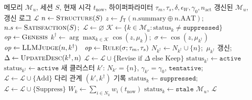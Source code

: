 \documentclass[10pt,twocolumn,letterpaper]{article}
\newcommand{\sT}{\mathsf{T}}
\newcommand{\cM}{\mathcal{M}}
\newcommand{\cK}{\mathcal{K}}
\newcommand{\op}[1]{\textsc{#1}}
\begin{document}
\begin{algorithm}[t]
\caption{$\op{Write}$: 세션 종료 시 장기 메모리 갱신}
\label{alg:write}
\small
\begin{algorithmic}[1]
\Require 메모리 $\cM_u$, 세션 $S$, 현재 시각 $t_{\mathrm{now}}$, 하이퍼파라미터 $\tau_m,\tau_s,\delta,\epsilon_W,\gamma_0,n_{\mathrm{act}}$
\Ensure 갱신된 $\cM_u$, 갱신 로그 $\mathcal{L}$
\State $n\gets\op{Structure}(S)$ 
\State $z\gets f_\sT(n.\mathrm{summary}\oplus n.\mathrm{AAT})$;\ $n.s\gets\op{Satisfaction}(S)$;\ $\mathcal{L}\gets\varnothing$
\State $\cK\gets\{k\in\cM_u:\mathrm{status}_k\ne\texttt{suppressed}\}$
\If{$\cK=\varnothing$} $\mathit{op}\gets\textsc{Genesis}$
\Else
  \State $k^\dagger\gets\arg\max_{k\in\cK}\cos(z,\mu_k)$;\ $\sigma\gets\cos(z,\mu_{k^\dagger})$
    \State $\mathit{op}\gets\op{LLMJudge}(n,k^\dagger)$ 
  \Else\ \State $\mathit{op}\gets\op{Rule}(\sigma;\tau_m,\tau_s)$ 
  \EndIf
\EndIf
{}
  \State $N_{k^\dagger}\gets N_{k^\dagger}\cup\{n\}$;\ $\mu_{k^\dagger}$ 갱신;\ $\Delta\gets\op{UpdateDesc}(k^\dagger,n)$
  \State $\mathcal{L}\gets\mathcal{L}\cup\{\text{Revise if }\Delta\text{ else Keep}\}$
   $\mathrm{status}_{k^\dagger}\gets\texttt{active}$
   $\mathrm{status}_{k^\dagger}\gets\texttt{active}$ 
  \EndIf
\Else {}
  \State 새 클러스터 $k'$: $N_{k'}=\{n\}$, $\gamma_{k'}=\gamma_0$, $\texttt{tentative}$;\ $\mathcal{L}\gets\mathcal{L}\cup\{\text{Add}\}$
   다리 관계 $(k',k^\dagger)$ 기록 \EndIf
\EndIf
{}
  \For{$k$ with $\op{Matches}(q,k)$} $\mathrm{status}_k\gets\texttt{suppressed}$;\ $\mathcal{L}\gets\mathcal{L}\cup\{\text{Suppress}\}$ \EndFor
\EndFor
{}
  \State $W_k\gets\sum_{i\in N_k}w_i(t_{\mathrm{now}})$ 
   $\mathrm{status}_k\gets\texttt{stale}$ \EndIf
\EndFor
\State \Return $\cM_u,\ \mathcal{L}$
\end{algorithmic}
\end{algorithm}
\end{document}
